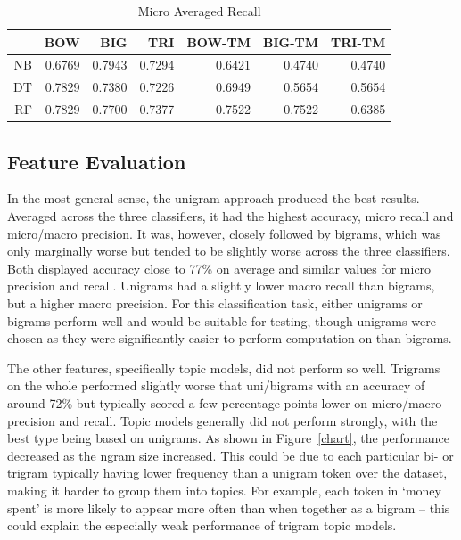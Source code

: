 \documentclass[11pt]{article}
\begin{document}
\begin{table}[htbp]
  \centering
  \caption{Micro Averaged Recall}
    \begin{tabular}{rrrrrrr}
    \toprule
          & BOW   & BIG   & TRI   & BOW-TM & BIG-TM & TRI-TM \\
    \midrule
    NB    & 0.6769 & 0.7943 & 0.7294 & 0.6421 & 0.4740 & 0.4740 \\
    DT    & 0.7829 & 0.7380 & 0.7226 & 0.6949 & 0.5654 & 0.5654 \\
    RF    & 0.7829 & 0.7700 & 0.7377 & 0.7522 & 0.7522 & 0.6385 \\
    \bottomrule
    \end{tabular}%
  \label{tab:mir}%
\end{table}%

\subsection{Feature Evaluation}
In the most general sense, the unigram approach produced the best results. Averaged across the three classifiers, it had the highest accuracy, micro recall and micro/macro precision. It was, however, closely followed by bigrams, which was only marginally worse but tended to be slightly worse across the three classifiers. Both displayed accuracy close to 77\% on average and similar values for micro precision and recall. Unigrams had a slightly lower macro recall than bigrams, but a higher macro precision. For this classification task, either unigrams or bigrams perform well and would be suitable for testing, though unigrams were chosen as they were significantly easier to perform computation on than bigrams.

The other features, specifically topic models, did not perform so well. Trigrams on the whole performed slightly worse that uni/bigrams with an accuracy of around 72\% but typically scored a few percentage points lower on micro/macro precision and recall. Topic models generally did not perform strongly, with the best type being based on unigrams. As shown in Figure~\ref{chart}, the performance decreased as the ngram size increased. This could be due to each particular bi- or trigram typically having lower frequency than a unigram token over the dataset, making it harder to group them into topics. For example, each token in `money spent' is more likely to appear more often than when together as a bigram – this could explain the especially weak performance of trigram topic models.
\end{document}
